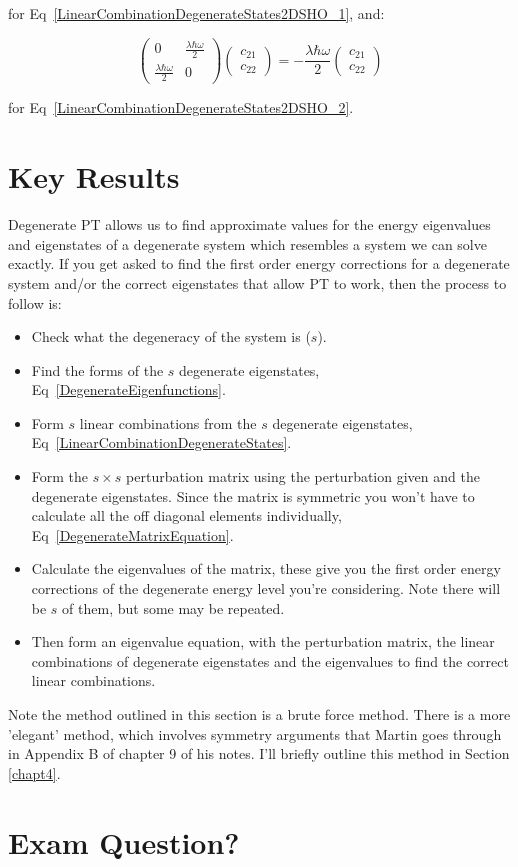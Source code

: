 \noindent for Eq~\ref{LinearCombinationDegenerateStates2DSHO_1}, and:

\begin{equation}
    \begin{pmatrix} 0 & \frac{\lambda \hbar \omega}{2} \\ \frac{\lambda \hbar \omega}{2} & 0 \end{pmatrix} \begin{pmatrix} c_{21} \\ c_{22} \end{pmatrix} = - \frac{\lambda \hbar \omega}{2} \begin{pmatrix} c_{21} \\ c_{22} \end{pmatrix}
\end{equation}

\noindent for Eq~\ref{LinearCombinationDegenerateStates2DSHO_2}.

\section{Key Results}
Degenerate PT allows us to find approximate values for the energy eigenvalues and eigenstates of a degenerate system which resembles a system we can solve exactly. If you get asked to find the first order energy corrections for a degenerate system and/or the correct eigenstates that allow PT to work, then the process to follow is:

\begin{itemize}
    \item Check what the degeneracy of the system is ($s$).
    \item Find the forms of the $s$ degenerate eigenstates, Eq~\ref{DegenerateEigenfunctions}.
    \item Form $s$ linear combinations from the $s$ degenerate eigenstates, Eq~\ref{LinearCombinationDegenerateStates}.
    \item Form the $s \times s$ perturbation matrix using the perturbation given and the degenerate eigenstates. Since the matrix is symmetric you won't have to calculate all the off diagonal elements individually, Eq~\ref{DegenerateMatrixEquation}.
    \item Calculate the eigenvalues of the matrix, these give you the first order energy corrections of the degenerate energy level you're considering. Note there will be $s$ of them, but some may be repeated.
    \item Then form an eigenvalue equation, with the perturbation matrix, the linear combinations of degenerate eigenstates and the eigenvalues to find the correct linear combinations.
\end{itemize}

\noindent Note the method outlined in this section is a brute force method. There is a more 'elegant' method, which involves symmetry arguments that Martin goes through in Appendix B of chapter 9 of his notes. I'll briefly outline this method in Section \ref{chapt4}.

\section{Exam Question?}


